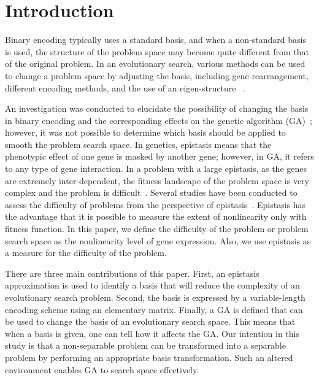 \section{Introduction}
Binary encoding typically uses a standard basis, and when a non-standard basis is used, the structure of the problem space may become quite different from that of the original problem. In an evolutionary search, various methods can be used to change a problem space by adjusting the basis, including gene rearrangement, different encoding methods, and the use of an eigen-structure ~\cite{hwang2006multi, CHANG20091210, sankoff1998multiple, raidl2000weighted, falkenauer1994new, gen2006genetic, wang2009genetic, lotfi2013genetic, pernkopf2001feature, wang2006new, wu2012novel, wyatt2003finding}.

An investigation was conducted to elucidate the possibility of changing the basis in binary encoding and the corresponding effects on the genetic algorithm (GA)~\cite{kim2008effect}; however, it was not possible to determine which basis should be applied to smooth the problem search space. In genetics, epistasis means that the phenotypic effect of one gene is masked by another gene; however, in GA, it refers to any type of gene interaction. In a problem with a large epistasis, as the genes are extremely inter-dependent, the fitness landscape of the problem space is very complex and the problem is difficult~\cite{davidor1990epistasis}.
Several studies have been conducted to assess the difficulty of problems from the perspective of epistasis~\cite{seo2003new, seo2004new, ventresca2007epistasis, seo2005computing, reeves1995epistasis, naudts2000comparison, beasley1993reducing}.
Epistasis has the advantage that it is possible to measure the extent of nonlinearity only with fitness function.
In this paper, we define the difficulty of the problem or problem search space as the nonlinearity level of gene expression. Also, we use epistasis as a measure for the difficulty of the problem.


There are three main contributions of this paper. First, an epistasis approximation is used to identify a basis that will reduce the complexity of an evolutionary search problem. Second, the basis is expressed by a variable-length encoding scheme using an elementary matrix. Finally, a GA is defined that can be used to change the basis of an evolutionary search space. This means that when a basis is given, one can tell how it affects the GA.
Our intention in this study is that a non-separable problem can be transformed into a separable problem by performing an appropriate basis transformation. Such an altered environment enables GA to search space effectively.

